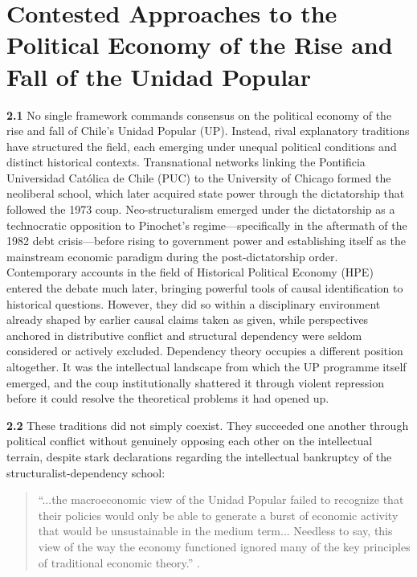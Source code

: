 \section{Contested Approaches to the Political Economy of the Rise and Fall of the Unidad Popular}
\label{sec:literature_review}

\textbf{2.1} No single framework commands consensus on the political economy of the rise and fall of Chile's Unidad Popular (UP). Instead, rival explanatory traditions have structured the field, each emerging under unequal political conditions and distinct historical contexts. Transnational networks linking the Pontificia Universidad Católica de Chile (PUC) to the University of Chicago formed the neoliberal school, which later acquired state power through the dictatorship that followed the 1973 coup. Neo-structuralism emerged under the dictatorship as a technocratic opposition to Pinochet's regime—specifically in the aftermath of the 1982 debt crisis—before rising to government power and establishing itself as the mainstream economic paradigm during the post-dictatorship order. Contemporary accounts in the field of Historical Political Economy (HPE) entered the debate much later, bringing powerful tools of causal identification to historical questions. However, they did so within a disciplinary environment already shaped by earlier causal claims taken as given, while perspectives anchored in distributive conflict and structural dependency were seldom considered or actively excluded. Dependency theory occupies a different position altogether. It was the intellectual landscape from which the UP programme itself emerged, and the coup institutionally shattered it through violent repression before it could resolve the theoretical problems it had opened up.

\textbf{2.2} These traditions did not simply coexist. They succeeded one another through political conflict without genuinely opposing each other on the intellectual terrain, despite stark declarations regarding the intellectual bankruptcy of the structuralist-dependency school: 

\begin{quote}
	``...the macroeconomic view of the Unidad Popular failed to recognize that their policies would only be able to generate a burst of economic activity that would be unsustainable in the medium term... Needless to say, this view of the way the economy functioned ignored many of the key principles of traditional economic theory.'' \citep[p.~16--17]{DornbuschEdwards1989}.
\end{quote}

